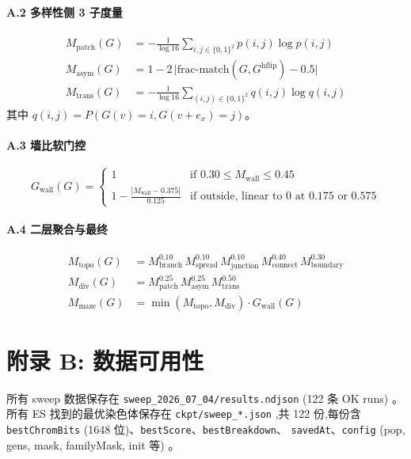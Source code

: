 \documentclass[11pt,a4paper]{article}
\begin{document}
\paragraph{A.2 多样性侧 3 子度量}
\begin{align}
M_{\text{patch}}(G) &= -\frac{1}{\log 16} \sum_{i,j \in \{0,1\}^2} p(i,j) \log p(i,j) \\
M_{\text{asym}}(G) &= 1 - 2\,\big|\text{frac-match}(G, G^{\text{hflip}}) - 0.5\big| \\
M_{\text{trans}}(G) &= -\frac{1}{\log 16} \sum_{(i,j) \in \{0,1\}^2} q(i,j) \log q(i,j)
\end{align}
其中 $q(i,j) = P(G(v) = i, G(v + e_x) = j)$。

\paragraph{A.3 墙比软门控}
\begin{equation}
G_{\text{wall}}(G) = \begin{cases}
1 & \text{if } 0.30 \le M_{\text{wall}} \le 0.45 \\
1 - \frac{|M_{\text{wall}} - 0.375|}{0.125} & \text{if outside, linear to 0 at } 0.175 \text{ or } 0.575
\end{cases}
\end{equation}

\paragraph{A.4 二层聚合与最终}
\begin{align}
M_{\text{topo}}(G) &= M_{\text{branch}}^{0.10}\, M_{\text{spread}}^{0.10}\, M_{\text{junction}}^{0.10}\,
                       M_{\text{connect}}^{0.40}\, M_{\text{boundary}}^{0.30} \\
M_{\text{div}}(G)  &= M_{\text{patch}}^{0.25}\, M_{\text{asym}}^{0.25}\, M_{\text{trans}}^{0.50} \\
M_{\text{maze}}(G) &= \min(M_{\text{topo}}, M_{\text{div}}) \cdot G_{\text{wall}}(G)
\end{align}

\section{附录 B: 数据可用性}
所有 sweep 数据保存在 \texttt{sweep\_2026\_07\_04/results.ndjson} (122 条 OK runs) 。
所有 ES 找到的最优染色体保存在 \texttt{ckpt/sweep\_*.json} ,共 122 份,每份含
\texttt{bestChromBits} (1648 位)、\texttt{bestScore}、\texttt{bestBreakdown}、
\texttt{savedAt}、\texttt{config} (pop, gens, mask, familyMask, init 等) 。
\end{document}
